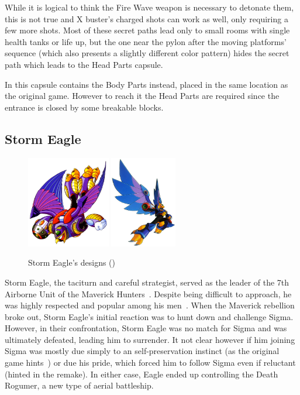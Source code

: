 While it is logical to think the Fire Wave weapon is necessary to detonate them, this is not true and X buster's charged shots can work as well, only requiring a few more shots. Most of these secret paths lead only to small rooms with single health tanks or life up, but the one near the pylon after the moving platforms' sequence (which also presents a slightly different color pattern) hides the  secret path which leads to the Head Parts capsule. 

In \mhx this capsule contains the Body Parts instead, placed in the same location as the original game. However to reach it the Head Parts are required since the entrance is closed by some breakable blocks.

\subsection{Storm Eagle}\label{boss:Storm_Eagle}
\begin{figure}[htp]
	\centering
	\includegraphics[height=4cm]{figures/X1/Storm_eagle/Storm_Eagle.jpg}
	\includegraphics[height=4cm]{figures/X1/Storm_eagle/MHXStormEagle.jpg}
	\caption{Storm Eagle's designs (\cite{book:MMX_Complete_art})}
\end{figure}
Storm Eagle, the taciturn and careful strategist, served as the leader of the 7th Airborne Unit of the Maverick Hunters~\cite{wiki:Storm_eagle}. Despite being difficult to approach, he was highly respected and popular among his men~\cite{MHX:manual}. When the Maverick rebellion broke out, Storm Eagle's initial reaction was to hunt down and challenge Sigma. However, in their confrontation, Storm Eagle was no match for Sigma and was ultimately defeated, leading him to surrender. It not clear however if him joining Sigma was mostly due simply to an self-preservation instinct (as the original game  hints~\cite{Xcoll1:Manual_X1}) or due his pride, which forced him to follow Sigma even if reluctant (hinted in the remake). In either case, Eagle ended up controlling the Death Rogumer, a new type of aerial battleship.

